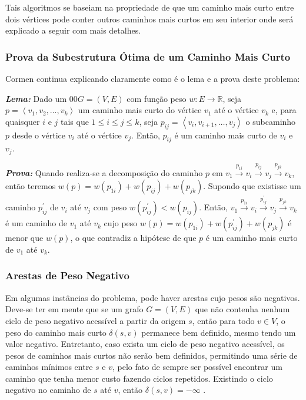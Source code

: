 \documentclass[12pt]{article}
\begin{document}
Tais algoritmos se baseiam na propriedade de que um caminho mais curto entre dois vértices pode conter outros caminhos mais curtos em seu interior onde será explicado a seguir com mais detalhes.



\subsubsection{Prova da Subestrutura Ótima de um Caminho Mais Curto}

Cormen \cite{cormen2002algoritmos} continua explicando claramente como é o lema e a prova deste problema:

\textit{\textbf{Lema:}} Dado um 00$G = (V, E)$ com função peso $w : E \rightarrow \mathbb{R}$, seja $p = \left \langle v_{1}, v_{2}, \ldots, v_{k}\right \rangle$ um caminho mais curto do vértice $v_1$ até o vértice $v_k$ e, para quaisquer $i$ e $j$ tais que $1 \le i \le j \le k$, seja $p_{ij}= \left \langle v_{i}, v_{i + 1}, \ldots, v_{j}\right \rangle$ o subcaminho $p$ desde o vértice $v_i$ até o vértice $v_j$. Então, $p_{ij}$ é um caminho mais curto de $v_i$ e $v_j$.

\textit{\textbf{Prova:}} Quando realiza-se a decomposição do caminho $p$ em $v_1 \xrightarrow{p_{1i}} v_i \xrightarrow{p_{ij}} v_j \xrightarrow{p_{jk}} v_k$, então teremos $w(p) = w(p_{1i}) + w(p_{ij}) + w(p_{jk})$. Supondo que existisse um caminho $p^\prime_{ij}$ de $v_i$ até $v_j$ com peso $w(p^\prime_{ij}) < w(p_{ij})$. Então, $v_1 \xrightarrow{p_{1i}} v_i \xrightarrow{p^\prime_{ij}} v_j \xrightarrow{p_{jk}} v_k$ é um caminho de $v_1$ até $v_k$ cujo peso $w(p) = w(p_{1i}) + w(p^\prime_{ij}) + w(p_{jk})$ é menor que $w(p)$, o que contradiz a hipótese de que $p$ é um caminho mais curto de $v_1$ até $v_k$.



\subsubsection{Arestas de Peso Negativo}

Em algumas instâncias do problema, pode haver arestas cujo pesos são negativos. Deve-se ter em mente que se um grafo $G = (V,E)$ que não contenha nenhum ciclo de peso negativo acessível a partir da origem $s$, então para todo $v \in V$, o peso do caminho mais curto $\delta(s,v)$ permanece bem definido, mesmo tendo um valor negativo. Entretanto, caso exista um ciclo de peso negativo acessível, os pesos de caminhos mais curtos não serão bem definidos, permitindo uma série de caminhos mínimos entre $s$ e $v$, pelo fato de sempre ser possível encontrar um caminho que tenha menor custo fazendo ciclos repetidos. Existindo o ciclo negativo no caminho de $s$ até $v$, então $\delta(s,v) = - \infty$ \cite{cormen2002algoritmos}.
\end{document}
